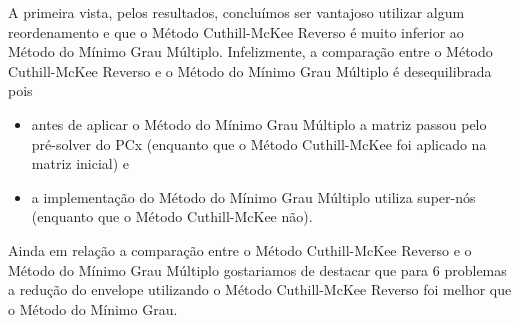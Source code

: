 A primeira vista, pelos resultados, concluímos ser vantajoso utilizar algum
reordenamento e que o Método Cuthill-McKee Reverso é muito inferior ao Método do
Mínimo Grau Múltiplo. Infelizmente, a comparação entre o Método Cuthill-McKee
Reverso e o Método do Mínimo Grau Múltiplo é desequilibrada pois
\begin{itemize}
  \item antes de aplicar o Método do Mínimo Grau Múltiplo a matriz passou pelo
    pré-solver do PCx (enquanto que o Método Cuthill-McKee foi aplicado na
    matriz inicial) e
  \item a implementação do Método do Mínimo Grau Múltiplo utiliza super-nós
    (enquanto que o Método Cuthill-McKee não).
\end{itemize}
Ainda em relação a comparação entre o Método Cuthill-McKee Reverso e o Método do
Mínimo Grau Múltiplo gostariamos de destacar que para 6 problemas a redução do
envelope utilizando o Método Cuthill-McKee Reverso foi melhor que o Método do
Mínimo Grau.
